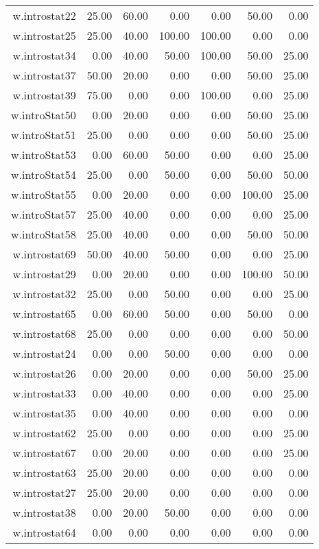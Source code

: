 \documentclass[12pt,english,nohyper]{tufte-handout}\usepackage[]{graphicx}\usepackage[]{color}
\begin{document}
\begin{longtable}{rrrrrrr}
  w.introstat22 & 25.00 & 60.00 & 0.00 & 0.00 & 50.00 & 0.00 \\ 
  w.introstat25 & 25.00 & 40.00 & 100.00 & 100.00 & 0.00 & 0.00 \\ 
  w.introstat34 & 0.00 & 40.00 & 50.00 & 100.00 & 50.00 & 25.00 \\ 
  w.introstat37 & 50.00 & 20.00 & 0.00 & 0.00 & 50.00 & 25.00 \\ 
  w.introstat39 & 75.00 & 0.00 & 0.00 & 100.00 & 0.00 & 25.00 \\ 
  w.introStat50 & 0.00 & 20.00 & 0.00 & 0.00 & 50.00 & 25.00 \\ 
  w.introStat51 & 25.00 & 0.00 & 0.00 & 0.00 & 50.00 & 25.00 \\ 
  w.introStat53 & 0.00 & 60.00 & 50.00 & 0.00 & 0.00 & 25.00 \\ 
  w.introStat54 & 25.00 & 0.00 & 50.00 & 0.00 & 50.00 & 50.00 \\ 
  w.introStat55 & 0.00 & 20.00 & 0.00 & 0.00 & 100.00 & 25.00 \\ 
  w.introStat57 & 25.00 & 40.00 & 0.00 & 0.00 & 0.00 & 25.00 \\ 
  w.introStat58 & 25.00 & 40.00 & 0.00 & 0.00 & 50.00 & 50.00 \\ 
  w.introstat69 & 50.00 & 40.00 & 50.00 & 0.00 & 0.00 & 25.00 \\ 
  w.introstat29 & 0.00 & 20.00 & 0.00 & 0.00 & 100.00 & 50.00 \\ 
  w.introstat32 & 25.00 & 0.00 & 50.00 & 0.00 & 0.00 & 25.00 \\ 
  w.introstat65 & 0.00 & 60.00 & 50.00 & 0.00 & 50.00 & 0.00 \\ 
  w.introstat68 & 25.00 & 0.00 & 0.00 & 0.00 & 0.00 & 50.00 \\ 
  w.introstat24 & 0.00 & 0.00 & 50.00 & 0.00 & 0.00 & 0.00 \\ 
  w.introstat26 & 0.00 & 20.00 & 0.00 & 0.00 & 50.00 & 25.00 \\ 
  w.introstat33 & 0.00 & 40.00 & 0.00 & 0.00 & 0.00 & 25.00 \\ 
  w.introstat35 & 0.00 & 40.00 & 0.00 & 0.00 & 0.00 & 0.00 \\ 
  w.introstat62 & 25.00 & 0.00 & 0.00 & 0.00 & 0.00 & 25.00 \\ 
  w.introstat67 & 0.00 & 20.00 & 0.00 & 0.00 & 0.00 & 25.00 \\ 
  w.introstat63 & 25.00 & 20.00 & 0.00 & 0.00 & 0.00 & 0.00 \\ 
  w.introstat27 & 25.00 & 20.00 & 0.00 & 0.00 & 0.00 & 0.00 \\ 
  w.introstat38 & 0.00 & 20.00 & 50.00 & 0.00 & 0.00 & 0.00 \\ 
  w.introstat64 & 0.00 & 0.00 & 0.00 & 0.00 & 0.00 & 0.00 \\ 
   \hline
\hline
\end{longtable}
\end{document}
